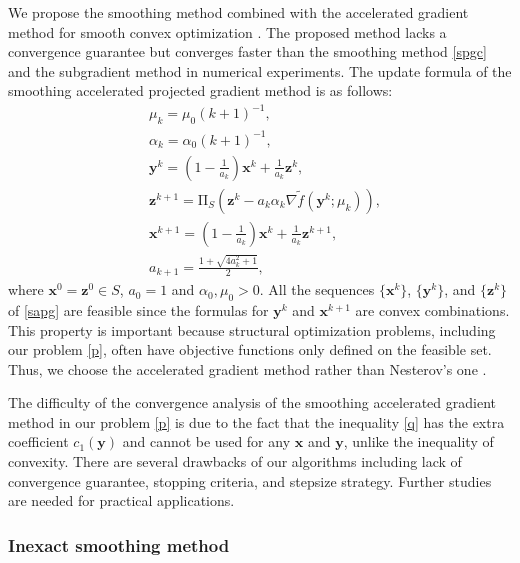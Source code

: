 \documentclass[sn-mathphys,Numbered]{sn-jnl}%
\theoremstyle{thmstyleone}%
\theoremstyle{thmstyletwo}%
\theoremstyle{thmstylethree}%
\newcommand{\prn}[1]{\left(#1\right)}
\begin{document}
We propose the smoothing method combined with the accelerated gradient method for smooth convex optimization \cite[Algorithm 20]{daspremont21}. The proposed method lacks a convergence guarantee but converges faster than the smoothing method \eqref{spgc} and the subgradient method \cite{kiwiel01} in numerical experiments. The update formula of the smoothing accelerated projected gradient method is as follows:
\begin{align}
& \mu_{k} = \mu_0(k+1)^{-1},\\
& \alpha_{k} = \alpha_0(k+1)^{-1},\\
& \bm{y}^k = \prn{1-\frac{1}{a_k}}\bm{x}^k+\frac{1}{a_k}\bm{z}^k,\\
& \bm{z}^{k+1} = \mathrm{\Pi}_S\prn{\bm{z}^k-a_k\alpha_k\nabla \tilde{f}(\bm{y}^{k};\mu_k)},\\
& \bm{x}^{k+1} = \prn{1-\frac{1}{a_k}}\bm{x}^k+\frac{1}{a_k}\bm{z}^{k+1},\\
& a_{k+1} = \frac{1+\sqrt{4a_{k}^2+1}}{2},
\label{sapg}
\end{align}
where $\bm{x}^0=\bm{z}^0\in S$, $a_0=1$ and $\alpha_0,\mu_0>0$. All the sequences $\{\bm{x}^k\}$, $\{\bm{y}^k\}$, and $\{\bm{z}^k\}$ of \eqref{sapg} are feasible since the formulas for $\bm{y}^k$ and $\bm{x}^{k+1}$ are convex combinations. This property is important because structural optimization problems, including our problem \eqref{p}, often have objective functions only defined on the feasible set. Thus, we choose the accelerated gradient method \cite[Algorihtm 20]{daspremont21} rather than Nesterov's one \cite{nesterov83}.

The difficulty of the convergence analysis of the smoothing accelerated gradient method in our problem \eqref{p} is due to the fact that the inequality \eqref{q} has the extra coefficient $c_1(\bm{y})$ and cannot be used for any $\bm{x}$ and $\bm{y}$, unlike the inequality of convexity. There are several drawbacks of our algorithms including lack of convergence guarantee, stopping criteria, and stepsize strategy. Further studies are needed for practical applications.

\subsubsection{Inexact smoothing method}
\end{document}
